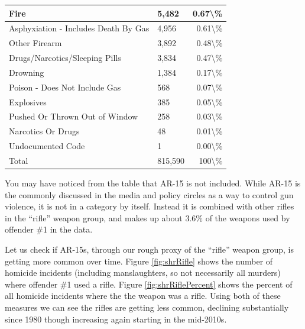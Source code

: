 \documentclass[
]{krantz}
\begin{document}
\begin{longtable}[t]{l|l|r}
\hline
Fire & 5,482 & 0.67\textbackslash{}\%\\
\hline
Asphyxiation - Includes Death By Gas & 4,956 & 0.61\textbackslash{}\%\\
\hline
Other Firearm & 3,892 & 0.48\textbackslash{}\%\\
\hline
Drugs/Narcotics/Sleeping Pills & 3,834 & 0.47\textbackslash{}\%\\
\hline
Drowning & 1,384 & 0.17\textbackslash{}\%\\
\hline
Poison - Does Not Include Gas & 568 & 0.07\textbackslash{}\%\\
\hline
Explosives & 385 & 0.05\textbackslash{}\%\\
\hline
Pushed Or Thrown Out of Window & 258 & 0.03\textbackslash{}\%\\
\hline
Narcotics Or Drugs & 48 & 0.01\textbackslash{}\%\\
\hline
Undocumented Code & 1 & 0.00\textbackslash{}\%\\
\hline
Total & 815,590 & 100\textbackslash{}\%\\
\hline
\end{longtable}

You may have noticed from the table that AR-15 is not
included. While AR-15 is the commonly discussed in the media
and policy circles as a way to control gun violence, it is
not in a category by itself. Instead it is combined with
other rifles in the ``rifle'' weapon group, and makes up
about 3.6\% of the weapons used by offender \#1 in the data.

Let us check if AR-15s, through our rough proxy of the
``rifle'' weapon group, is getting more common over time.
Figure \ref{fig:shrRifle} shows the number of homicide
incidents (including manslaughters, so not necessarily all
murders) where offender \#1 used a rifle. Figure
\ref{fig:shrRiflePercent} shows the percent of all homicide
incidents where the the weapon was a rifle. Using both of
these measures we can see the rifles are getting less
common, declining substantially since 1980 though increasing
again starting in the mid-2010s.
\end{document}
